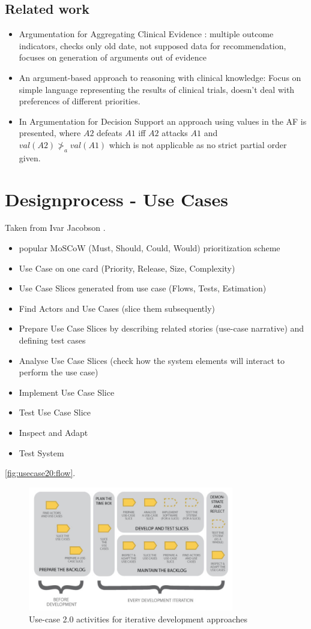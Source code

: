\subsection{Related work}
\begin{itemize}
	\item Argumentation for Aggregating Clinical Evidence \cite{hunter}: multiple outcome indicators, checks only old date, not supposed data for recommendation, focuses on generation of arguments out of evidence
	\item An argument-based approach to reasoning with clinical knowledge\cite{Gorogiannis20091}: Focus on simple language representing the results of clinical trials, doesn't deal with preferences of different priorities.
	\item In Argumentation for Decision Support\cite{Atkinson2006} an approach using values in the AF is presented, where $A2$ defeats $A1$ iff $A2$ attacks $A1$ and $val(A2) \ngtr_a val(A1)$ which is not applicable as no strict partial order given.
\end{itemize}


\section{Designprocess - Use Cases}
Taken from Ivar Jacobson .
\begin{itemize}
	\item popular MoSCoW (Must, Should, Could, Would) prioritization scheme
	\item Use Case on one card (Priority, Release, Size, Complexity)
	\item Use Case Slices generated from use case (Flows, Tests, Estimation)
	\item Find Actors and Use Cases (slice them subsequently)
	\item Prepare Use Case Slices by describing related stories (use-case narrative) and defining test cases
	\item Analyse Use Case Slices (check how the system elements will interact to perform the use case)
	\item Implement Use Case Slice
	\item Test Use Case Slice
	\item Inspect and Adapt
	\item Test System
\end{itemize}
\autoref{fig:usecase20:flow}.


\begin{figure}[!ht]
\centering
\includegraphics[width=0.8\textwidth]{figures/uc20_flow}
\caption{Use-case 2.0 activities for iterative development approaches}
\label{fig:usecase20:flow}
\end{figure}


